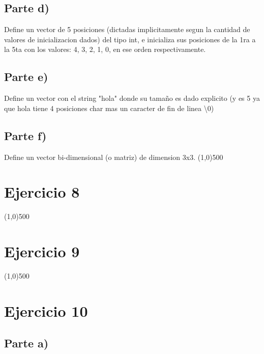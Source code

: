 \documentclass[letterpaper]{report}
\newcommand{\sectionh}[1]{\line(1,0){500}\section*{#1}}
\begin{document}
\subsection*{Parte d)}
Define un vector de 5 posiciones (dictadas implicitamente segun la cantidad de valores de inicializacion dados) del tipo int, e inicializa sus posiciones de la 1ra a la 5ta con los valores: 4, 3, 2, 1, 0, en ese orden respectivamente.
\subsection*{Parte e)}
Define un vector con el string "hola" donde su tamaño es dado explicito (y es 5 ya que hola tiene 4 posiciones char mas un caracter de fin de linea \textquotesingle \textbackslash0\textquotesingle )
\subsection*{Parte f)}
Define un vector bi-dimensional (o matriz) de dimension 3x3.
\sectionh{Ejercicio 8}
\sectionh{Ejercicio 9}
\sectionh{Ejercicio 10}
\subsection*{Parte a)}
\end{document}
